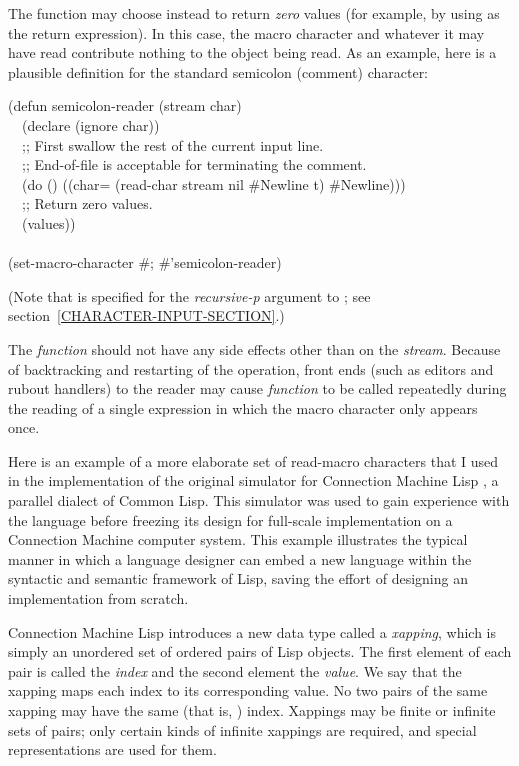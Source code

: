 \begin{defun}[Function]

The function may choose instead to return \emph{zero} values
(for example, by using  as the return expression).
In this case, the macro character and whatever it may have read
contribute nothing to the object being read.
As an example, here is a plausible definition for the standard semicolon
(comment) character:
\begin{lisp}
(defun semicolon-reader (stream char) \\
~~(declare (ignore char)) \\
~~;; First swallow the rest of the current input line. \\
~~;; End-of-file is acceptable for terminating the comment. \\
~~(do () ((char= (read-char stream nil \#{\Xbackslash}Newline t) \#{\Xbackslash}Newline))) \\
~~;; Return zero values. \\
~~(values)) \\
 \\
(set-macro-character \#{\Xbackslash}; \#'semicolon-reader)
\end{lisp}
(Note that {\true} is specified for the \emph{recursive-p} argument
to ; see section~\ref{CHARACTER-INPUT-SECTION}.)

The \emph{function} should not have any side effects other than on the
\emph{stream}.
Because of backtracking and restarting of the  operation,
front ends (such as editors and
rubout handlers) to the reader may cause
\emph{function} to be called repeatedly during the
reading of a single expression in which the macro character only appears
once.

\begin{new}
Here is an example of a more elaborate set of read-macro characters
that I used in the implementation of the original
simulator for Connection Machine Lisp
\cite{CONNECTION-MACHINE-LISP,CMLISP-IMPLEMENTATION},
a parallel dialect of Common Lisp.  This simulator was used to gain experience with
the language before freezing its design for full-scale implementation on a
Connection Machine computer system.  This example illustrates the typical manner
in which a language designer can embed a new language within the syntactic and
semantic framework of Lisp, saving the effort of designing an implementation
from scratch.

Connection Machine Lisp introduces a new data type called a \emph{xapping},
which is simply an unordered set of ordered pairs of Lisp objects.
The first element of each pair is called the \emph{index} and the second element
the \emph{value}.  We say that the xapping maps each index to its corresponding value.
No two pairs of the same xapping may have the same (that is, ) index.
Xappings may be finite or infinite sets of pairs; only certain kinds
of infinite xappings are required, and special representations are used for them.


\end{new}
\end{defun}
